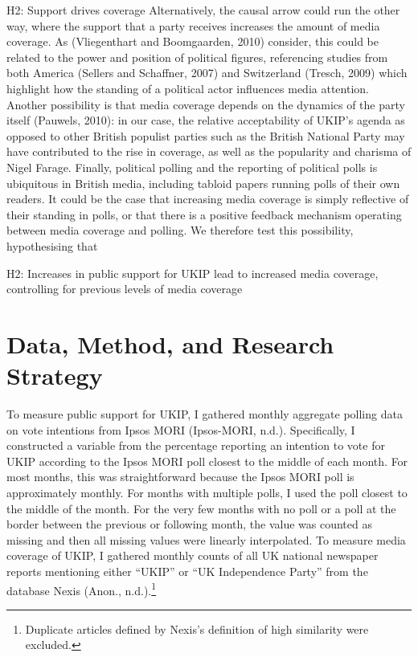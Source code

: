 \documentclass[12pt,article]{article}
\begin{document}
H2: Support drives coverage Alternatively, the causal arrow could run
the other way, where the support that a party receives increases the
amount of media coverage. As (Vliegenthart and Boomgaarden, 2010)
consider, this could be related to the power and position of political
figures, referencing studies from both America (Sellers and Schaffner,
2007) and Switzerland (Tresch, 2009) which highlight how the standing of
a political actor influences media attention. Another possibility is
that media coverage depends on the dynamics of the party itself
(Pauwels, 2010): in our case, the relative acceptability of UKIP's
agenda as opposed to other British populist parties such as the British
National Party may have contributed to the rise in coverage, as well as
the popularity and charisma of Nigel Farage. Finally, political polling
and the reporting of political polls is ubiquitous in British media,
including tabloid papers running polls of their own readers. It could be
the case that increasing media coverage is simply reflective of their
standing in polls, or that there is a positive feedback mechanism
operating between media coverage and polling. We therefore test this
possibility, hypothesising that

H2: Increases in public support for UKIP lead to increased media
coverage, controlling for previous levels of media coverage

\section{Data, Method, and Research
Strategy}\label{data-method-and-research-strategy}

To measure public support for UKIP, I gathered monthly aggregate polling
data on vote intentions from Ipsos MORI (Ipsos-MORI, n.d.).
Specifically, I constructed a variable from the percentage reporting an
intention to vote for UKIP according to the Ipsos MORI poll closest to
the middle of each month. For most months, this was straightforward
because the Ipsos MORI poll is approximately monthly. For months with
multiple polls, I used the poll closest to the middle of the month. For
the very few months with no poll or a poll at the border between the
previous or following month, the value was counted as missing and then
all missing values were linearly interpolated. To measure media coverage
of UKIP, I gathered monthly counts of all UK national newspaper reports
mentioning either ``UKIP'' or ``UK Independence Party'' from the
database Nexis (Anon.,
n.d.).\footnote{Duplicate articles defined by Nexis's definition of high similarity were excluded.}
\end{document}
